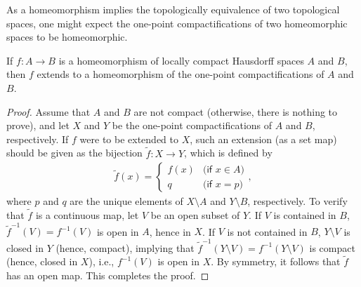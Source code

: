 As a homeomorphism implies the topologically equivalence of two topological spaces, one might expect the one-point compactifications of two homeomorphic spaces to be homeomorphic.
\begin{thm}\label{homeomorphism extends to 1p cptf.s}
    If $f: A\rightarrow B$ is a homeomorphism of locally compact Hausdorff spaces $A$ and $B$, then $f$ extends to a homeomorphism of the one-point compactifications of $A$ and $B$.
\end{thm}
\begin{proof}
    Assume that $A$ and $B$ are not compact (otherwise, there is nothing to prove), and let $X$ and $Y$ be the one-point compactifications of $A$ and $B$, respectively.
    If $f$ were to be extended to $X$, such an extension (as a set map) should be given as the bijection $\widetilde{f}: X\rightarrow Y$, which is defined by
    \begin{align*}
        \widetilde{f}(x)=\left\{\begin{array}{cc}
            f(x)    &   \textsf{(if $x\in A$)}\\
            q       &   \textsf{(if $x=p$)}
        \end{array}\right.,
    \end{align*}
    where $p$ and $q$ are the unique elements of $X\setminus A$ and $Y\setminus B$, respectively.
    To verify that $\widetilde{f}$ is a continuous map, let $V$ be an open subset of $Y$.
    If $V$ is contained in $B$, $\widetilde{f}^{-1}(V)=f^{-1}(V)$ is open in $A$, hence in $X$.
    If $V$ is not contained in $B$, $Y\setminus V$ is closed in $Y$ (hence, compact), implying that $\widetilde{f}^{-1}(Y\setminus V)=f^{-1}(Y\setminus V)$ is compact (hence, closed in $X$), i.e., $f^{-1}(V)$ is open in $X$.
    By symmetry, it follows that $\widetilde{f}$ has an open map.
    This completes the proof.
\end{proof}

